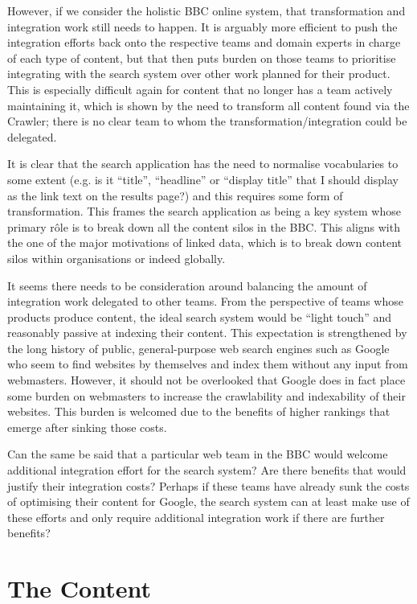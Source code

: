 However, if we consider the holistic BBC online system, that transformation
and integration work still needs to happen. It is arguably more efficient to
push the integration efforts back onto the respective teams and domain experts
in charge of each type of content, but that then puts burden on those teams
to prioritise integrating with the search system over other work planned
for their product. This is especially difficult again for content that no
longer has a team actively maintaining it, which is shown by the need
to transform all content found via the Crawler; there is no clear team to
whom the transformation/integration could be delegated.

It is clear that the search application has the need to normalise vocabularies
to some extent (e.g. is it ``title'', ``headline'' or ``display title''
that I should display as the link text on the results page?) and this requires
some form of transformation. This frames the search application as being a
key system whose primary r\^ole is to break down all the content silos in the
BBC. This aligns with the one of the major motivations of linked data, which
is to break down content silos within organisations or indeed globally.

It seems there needs to be consideration around balancing the amount of
integration work delegated to other teams. From the perspective of teams
whose products produce content, the ideal search system would be
``light touch'' and reasonably passive at indexing their content. This
expectation is strengthened by the long history of public, general-purpose
web search engines such as Google who seem to find websites by themselves
and index them without any input from webmasters. However, it should
not be overlooked that Google does in fact place some burden on webmasters
to increase the crawlability and indexability of their websites. This
burden is welcomed due to the benefits of higher rankings that emerge
after sinking those costs.

Can the same be said that a particular web team
in the BBC would welcome additional integration effort for the search system?
Are there benefits that would justify their integration costs? Perhaps if
these teams have already sunk the costs of optimising their content for
Google, the search system can at least make use of these efforts and only
require additional integration work if there are further benefits?

\section{The Content}
\label{content}

